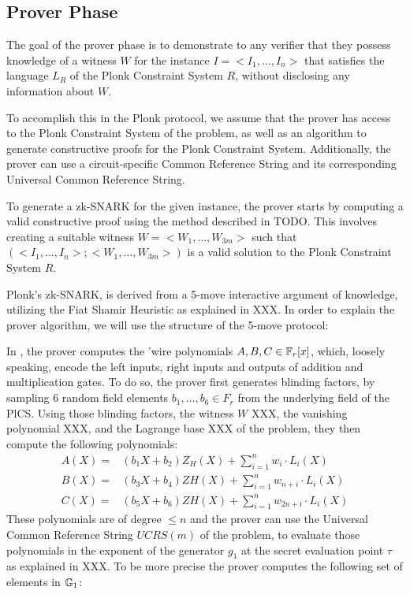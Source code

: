 \subsection{Prover Phase}
The goal of the prover phase is to demonstrate to any verifier that they possess knowledge of a witness $W$ for the instance $I=<I_1,\ldots, I_n>$ that satisfies the language $L_R$ of the Plonk Constraint System $R$, without disclosing any information about $W$.

To accomplish this in the Plonk protocol, we assume that the prover has access to the Plonk Constraint System of the problem, as well as an algorithm to generate constructive proofs for the Plonk Constraint System. Additionally, the prover can use a circuit-specific Common Reference String and its corresponding Universal Common Reference String.

To generate a zk-SNARK for the given instance, the prover starts by computing a valid constructive proof using the method described in TODO. This involves creating a suitable witness $W=<W_{1},\ldots,W_{3m}>$ such that $(<I_1,\ldots, I_n>; <W_{1},\ldots,W_{3m}>)$ is a valid solution to the Plonk Constraint System $R$.

Plonk's zk-SNARK, is derived from a 5-move interactive argument of knowledge, utilizing the Fiat Shamir Heuristic as explained in XXX. In order to explain the prover algorithm, we will use the structure of the 5-move protocol:

In , the prover computes the 'wire polynomials $A,B,C\in \mathbb{F}_r[x]$, which, loosely speaking, encode the left inputs, right inputs and outputs of addition and multiplication gates. To do so, the prover first generates blinding factors, by sampling $6$ random field elements $b_1, \ldots, b_6 \in F_r$ from the underlying field of the PlCS. Using those blinding factors, the witness $W$ XXX, the vanishing polynomial XXX, and the Lagrange base XXX of the problem, they then compute the following polynomials:
\begin{equation}
\begin{array}{rl}
A(X) =& (b_1X + b_2)Z_H(X) + \sum_{i=1}^n w_i\cdot L_i(X)\\
B(X) =& (b_3X + b_4)ZH(X) + \sum_{i=1}^n w_{n+i}\cdot L_i(X)\\
C(X) =& (b_5X + b_6)ZH(X) + \sum_{i=1}^n w_{2n+i}\cdot L_i(X)
\end{array}
\end{equation}
These polynomials are of degree $\leq n$ and the prover can use the Universal Common Reference String $UCRS(m)$ of the problem, to evaluate those polynomials in the exponent of the generator $g_1$ at the secret evaluation point $\tau$ as explained in XXX. To be more precise the prover computes the following set of elements in $\mathbb{G}_1$: 

